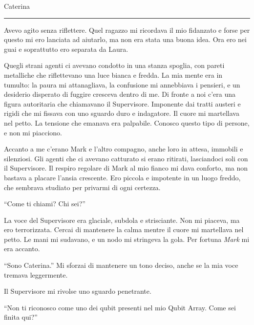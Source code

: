 \vspace{1em}
\begin{center}Caterina\end{center}
\hrule
\vspace{1em}

Avevo agito senza riflettere. Quel ragazzo mi ricordava il mio fidanzato e forse per questo mi ero lanciata ad aiutarlo, ma non era stata una buona idea. Ora ero nei guai e soprattutto ero separata da Laura.

Quegli strani agenti ci avevano condotto in una stanza spoglia, con pareti metalliche che riflettevano una luce bianca e fredda. La mia mente era in tumulto: la paura mi attanagliava, la confusione mi annebbiava i pensieri, e un desiderio disperato di fuggire cresceva dentro di me. Di fronte a noi c'era una figura autoritaria che chiamavano il Supervisore. Imponente dai tratti austeri e rigidi che mi fissava con uno sguardo duro e indagatore. Il cuore mi martellava nel petto. La tensione che emanava era palpabile. Conosco questo tipo di persone, e non mi piacciono.

Accanto a me c'erano Mark e l'altro compagno, anche loro in attesa, immobili e silenziosi. Gli agenti che ci avevano catturato si erano ritirati, lasciandoci soli con il Supervisore. Il respiro regolare di Mark al mio fianco mi dava conforto, ma non bastava a placare l'ansia crescente. Ero  piccola e impotente in un luogo freddo, che sembrava studiato per privarmi di ogni certezza.

\begin{dialogue}
 \enquote{Come ti chiami? Chi sei?}
\end{dialogue}

La voce del Supervisore era glaciale, subdola e strisciante. Non mi piaceva, ma ero terrorizzata. Cercai di mantenere la calma mentre  il cuore mi martellava nel petto. Le mani mi sudavano, e un nodo mi stringeva la gola. Per fortuna \textit{Mark} mi era accanto.

\begin{dialogue}
 \enquote{Sono Caterina.} Mi  sforzai di mantenere un tono deciso, anche se la mia voce tremava leggermente. 
\end{dialogue}

Il Supervisore mi rivolse uno sguardo penetrante.

\begin{dialogue}
 \enquote{Non ti riconosco come uno dei qubit presenti nel mio Qubit Array. Come sei finita qui?}
\end{dialogue}


